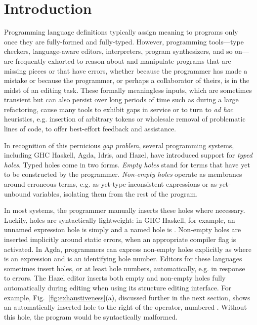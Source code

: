 \section{Introduction}
\label{sec:intro}

Programming language definitions typically assign meaning to programs only once they are fully-formed and fully-typed. 
However, programming tools---type checkers, language-aware editors, interpreters, program synthesizers, and so on---%
are frequently exhorted to reason about and manipulate programs that are missing pieces or that have errors,
whether because the programmer has made a mistake or because the programmer, or perhaps a collaborator of theirs, is in the midst of an editing task. 
These formally meaningless inputs, which are sometimes transient but can also persist over long periods of time such as during a large refactoring, cause many tools to exhibit gaps in service or to turn to  
\emph{ad hoc} heuristics, e.g. insertion of arbitrary tokens or wholesale removal of problematic lines of code, to offer best-effort feedback and assistance.

In recognition of this pernicious \emph{gap problem}, several programming systems, 
including GHC Haskell, Agda, Idris, and Hazel, have introduced
support for \emph{typed holes}. Typed holes come in two forms. \emph{Empty holes} 
stand for terms that have yet to be constructed by the programmer. 
\emph{Non-empty holes} 
operate as membranes around erroneous terms, e.g. as-yet-type-inconsistent
expressions or as-yet-unbound variables, 
isolating them from the rest of the program.

In most systems, the programmer manually inserts these holes where necessary.
Luckily, holes are syntactically lightweight: in GHC Haskell, for example, an unnamed expression
hole is simply \li{_} and a named hole is . 
Non-empty holes are inserted implicitly around static errors, when an appropriate compiler flag
is activated. In Agda, programmers can express  
non-empty holes explicitly as  where  is an expression and  is an identifying hole number.
Editors for these languages sometimes insert holes, or at least hole numbers, automatically, e.g. in response to errors. 
The Hazel editor inserts both empty and non-empty holes fully automatically during editing when using its structure editing interface.
For example, Fig.~\ref{fig:exhaustiveness}(a), discussed further in the next section, shows an automatically inserted hole to the right of the \li{::} operator, numbered . Without this hole, the program would be syntactically malformed.

